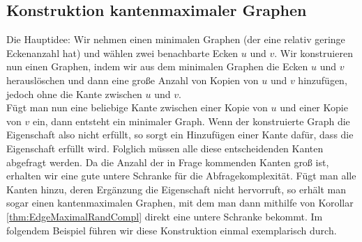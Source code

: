 \documentclass[a4paper]{scrreprt}
\theoremstyle{definition}
\begin{document}
\subsection{Konstruktion kantenmaximaler Graphen}
Die Hauptidee: Wir nehmen einen minimalen Graphen (der eine
relativ geringe Eckenanzahl hat) und wählen zwei benachbarte Ecken
$u$ und $v$. Wir konstruieren nun einen Graphen, indem wir aus dem
minimalen Graphen die Ecken $u$ und $v$ herauslöschen und dann eine große
Anzahl von Kopien von $u$ und $v$ hinzufügen, jedoch ohne die Kante
zwischen $u$ und $v$. \\
Fügt man nun eine beliebige Kante zwischen einer Kopie von $u$ und einer
Kopie von $v$ ein, dann entsteht ein minimaler Graph. Wenn der
konstruierte Graph die Eigenschaft also nicht erfüllt, so sorgt 
ein Hinzufügen einer Kante dafür, dass die Eigenschaft erfüllt wird.
Folglich müssen alle diese entscheidenden Kanten abgefragt werden.
Da die Anzahl der in Frage kommenden Kanten groß ist, erhalten
wir eine gute untere Schranke für die Abfragekomplexität.
Fügt man alle Kanten hinzu, deren Ergänzung die Eigenschaft
nicht hervorruft, so erhält man sogar einen kantenmaximalen Graphen,
mit dem man dann mithilfe von Korollar \ref{thm:EdgeMaximalRandCompl}
direkt eine untere Schranke bekommt.
Im folgendem Beispiel führen wir diese Konstruktion einmal
exemplarisch durch.
\end{document}
